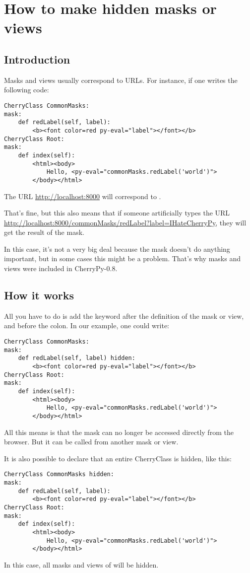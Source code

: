\documentclass{manual}
\begin{document}
\chapter{How to make hidden masks or views}
\section{Introduction}
Masks and views usually correspond to URLs. For instance, if one writes the following code:
\begin{verbatim}
CherryClass CommonMasks:
mask:
    def redLabel(self, label):
        <b><font color=red py-eval="label"></font></b>
CherryClass Root:
mask:
    def index(self):
        <html><body>
            Hello, <py-eval="commonMasks.redLabel('world')">
        </body></html>
\end{verbatim}
The URL \url{http://localhost:8000} will correspond to .

That's fine, but this also means that if someone artificially types the URL
\url{http://localhost:8000/commonMasks/redLabel?label=IHateCherryPy}, they will get the result of the  mask.

In this case, it's not a very big deal because the  mask doesn't do anything important, but in some cases
this might be a problem. That's why  masks and views were included in CherryPy-0.8.

\section{How it works}
All you have to do is add the keyword  after the definition of the mask or view, and before the colon.
In our example, one could write:
\begin{verbatim}
CherryClass CommonMasks:
mask:
    def redLabel(self, label) hidden:
        <b><font color=red py-eval="label"></font></b>
CherryClass Root:
mask:
    def index(self):
        <html><body>
            Hello, <py-eval="commonMasks.redLabel('world')">
        </body></html>
\end{verbatim}

All this means is that the  mask can no longer be accessed directly from the browser. But it can be called
from another mask or view.

It is also possible to declare that an entire CherryClass is hidden, like this:
\begin{verbatim}
CherryClass CommonMasks hidden:
mask:
    def redLabel(self, label):
        <b><font color=red py-eval="label"></font></b>
CherryClass Root:
mask:
    def index(self):
        <html><body>
            Hello, <py-eval="commonMasks.redLabel('world')">
        </body></html>
\end{verbatim}
In this case, all masks and views of  will be hidden.
\end{document}
